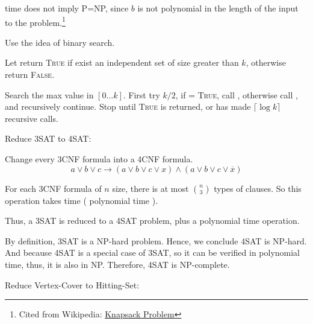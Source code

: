 \documentclass[12pt,letterpaper,titlepage,en-US]{article}
\begin{document}
\begin{homeworkProblem}[NP-completeness]
    \begin{homeworkSubProblem}
     time does not imply P=NP, since $b$ is not polynomial in the length of the input
    to the problem.\footnote{Cited from Wikipedia:
    \href{https://en.wikipedia.org/wiki/Knapsack_problem}{Knapsack Problem}}
\end{homeworkSubProblem}

\begin{homeworkSubProblem}
Use the idea of binary search.

Let  return \textsc{True} if exist
an independent set of size greater than $k$, otherwise return \textsc{False}.

Search the max value in $[0 \ldots k]$.
First try $k/2$, if  = \textsc{True},
call ,
otherwise 
call ,
and recursively continue.
Stop until \textsc{True} is returned,
or has made $\lceil\log k\rceil$ recursive calls.

\end{homeworkSubProblem}

\begin{homeworkSubProblem}[4SAT]
Reduce 3SAT to 4SAT:

Change every 3CNF formula into a 4CNF formula.
\[a \lor b \lor c \longrightarrow (a \lor b \lor c \lor x) \land (a \lor b \lor c \lor \overline{x})\]

For each 3CNF formula of $n$ size, there is at most $\binom{n}{3}$ types of clauses.
So this operation takes  time ( polynomial time ).

Thus, a 3SAT is reduced to a 4SAT problem, plus a polynomial time operation.

By definition, 3SAT is a NP-hard problem. Hence, we conclude 4SAT is NP-hard.
And because 4SAT is a special case of 3SAT, so it can be verified in polynomial time,
thus, it is also in NP.
Therefore, 4SAT is NP-complete.\hfill\qedsymbol
\end{homeworkSubProblem}

\begin{homeworkSubProblem}
Reduce Vertex-Cover to Hitting-Set:


\end{homeworkSubProblem}
\end{homeworkProblem}
\end{document}
